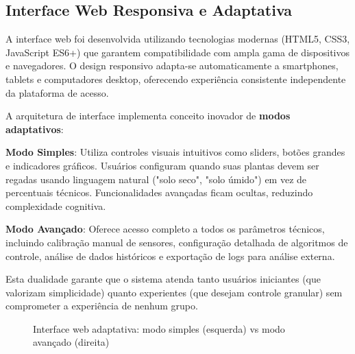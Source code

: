 \documentclass[twoside,english,brazilian]{UNISINOSmonografia}
\begin{document}
\subsection{Interface Web Responsiva e Adaptativa}

A interface web foi desenvolvida utilizando tecnologias modernas (HTML5, CSS3, JavaScript ES6+) que garantem compatibilidade com ampla gama de dispositivos e navegadores. O design responsivo adapta-se automaticamente a smartphones, tablets e computadores desktop, oferecendo experiência consistente independente da plataforma de acesso.

A arquitetura de interface implementa conceito inovador de \textbf{modos adaptativos}:

\textbf{Modo Simples}: Utiliza controles visuais intuitivos como sliders, botões grandes e indicadores gráficos. Usuários configuram quando suas plantas devem ser regadas usando linguagem natural ("solo seco", "solo úmido") em vez de percentuais técnicos. Funcionalidades avançadas ficam ocultas, reduzindo complexidade cognitiva.

\textbf{Modo Avançado}: Oferece acesso completo a todos os parâmetros técnicos, incluindo calibração manual de sensores, configuração detalhada de algoritmos de controle, análise de dados históricos e exportação de logs para análise externa.

Esta dualidade garante que o sistema atenda tanto usuários iniciantes (que valorizam simplicidade) quanto experientes (que desejam controle granular) sem comprometer a experiência de nenhum grupo.

\begin{figure}[htbp]
\centering
\caption{Interface web adaptativa: modo simples (esquerda) vs modo avançado (direita)}
\label{fig:interface_web}
\end{figure}
\end{document}

